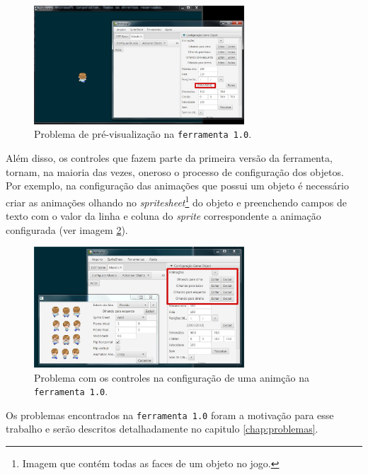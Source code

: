 \documentclass[12pt,twoside,openright,a4paper,english,brazil,sumario=tradicional]{abntex2}
\begin{document}
\begin{figure}[h]
\label{fig:intro-problema-1}
\centering
\includegraphics[width=0.7\textwidth]{images/problema-1.jpg}
\caption{Problema de pré-visualização na \texttt{ferramenta 1.0}.}
\end{figure}

Além disso, os controles que fazem parte da primeira versão da ferramenta, tornam, na maioria das vezes, oneroso o processo de configuração dos objetos. Por exemplo, na configuração das animações que possui um objeto é necessário criar as animações olhando no \emph{spritesheet}\footnote{Imagem que contém todas as faces de um objeto no jogo.} do objeto e preenchendo campos de texto com o valor da linha e coluna do \emph{sprite} correspondente a animação configurada (ver imagem \ref{fig:intro-problema-2}).

\begin{figure}[h]
\label{fig:intro-problema-2}
\centering
\includegraphics[width=0.7\textwidth]{images/problema-2.jpg}
\caption{Problema com os controles na configuração de uma animção na \texttt{ferramenta 1.0}.}
\end{figure}

Os problemas encontrados na \texttt{ferramenta 1.0} foram a motivação para esse trabalho e serão descritos detalhadamente no capitulo \ref{chap:problemas}.
\end{document}
